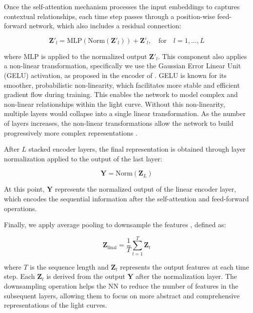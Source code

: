 Once the self-attention mechanism processes the input embeddings to captures contextual relationships, each time step passes through a position-wise feed-forward network, which also includes a residual connection:

\begin{equation}
\mathbf{Z'}_{l} = \mathrm{MLP}({\mathrm{Norm}(\mathbf{Z'}_{l})}) + \mathbf{Z'}_{l}, \quad \mathrm{for} \quad l=1,..., L
\end{equation}

where $\mathrm{MLP}$ is applied to the normalized output $\mathbf{Z'}_l$. This component also applies a non-linear transformation, specifically we use the Gaussian Error Linear Unit (GELU) \citep{hendrycks2016gaussian} activation, as proposed in the encoder of \citep{dosovitskiy2020image}. GELU is known for its smoother, probabilistic non-linearity, which facilitates more stable and efficient gradient flow during training. This enables the network to model complex and non-linear relationships within the light curve. Without this non-linearity, multiple layers would collapse into a single linear transformation. As the number of layers increases, the non-linear transformations allow the network to build progressively more complex representations \citep{goodfellow2016deep, dosovitskiy2020image}. \par

After $L$ stacked encoder layers, the final representation is obtained through layer normalization applied to the output of the last layer:

\begin{equation}
    \mathbf{Y} = \mathrm{Norm}(\mathbf{Z}_L)
\end{equation}

At this point, $\mathbf{Y}$ represents the normalized output of the linear encoder layer, which encodes the sequential information after the self-attention and feed-forward operations. 

Finally, we apply average pooling to downsample the features \citep{lecun2015deep}, defined as: 

\begin{equation}
\mathbf{Z}_{\mathrm{final}} = \frac{1}{T} \sum_{t=1}^{T} \mathbf{Z}_t
\end{equation}

where $T$ is the sequence length and $\mathbf{Z}_t$ represents the output features at each time step. Each $\mathbf{Z}_t$ is derived from the output $\mathbf{Y}$ after the normalization layer. The downsampling operation helps the NN to reduce the number of features in the subsequent layers, allowing them to focus on more abstract and comprehensive representations of the light curves. \par


